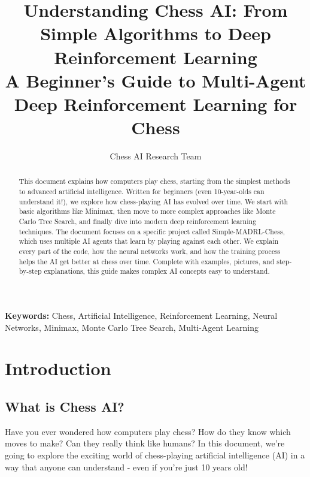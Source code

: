 \documentclass[11pt]{article}
\begin{document}
\title{Understanding Chess AI: From Simple Algorithms to Deep Reinforcement Learning\\\large A Beginner's Guide to Multi-Agent Deep Reinforcement Learning for Chess}
\author{Chess AI Research Team}
\date{}

\maketitle

\begin{abstract}
This document explains how computers play chess, starting from the simplest methods to advanced artificial intelligence. Written for beginners (even 10-year-olds can understand it!), we explore how chess-playing AI has evolved over time. We start with basic algorithms like Minimax, then move to more complex approaches like Monte Carlo Tree Search, and finally dive into modern deep reinforcement learning techniques. The document focuses on a specific project called Simple-MADRL-Chess, which uses multiple AI agents that learn by playing against each other. We explain every part of the code, how the neural networks work, and how the training process helps the AI get better at chess over time. Complete with examples, pictures, and step-by-step explanations, this guide makes complex AI concepts easy to understand.
\end{abstract}

\begin{center}
\textbf{Keywords:} Chess, Artificial Intelligence, Reinforcement Learning, Neural Networks, Minimax, Monte Carlo Tree Search, Multi-Agent Learning
\end{center}

\section{Introduction}
\subsection{What is Chess AI?}

Have you ever wondered how computers play chess? How do they know which moves to make? Can they really think like humans? In this document, we're going to explore the exciting world of chess-playing artificial intelligence (AI) in a way that anyone can understand - even if you're just 10 years old!

\onecolumn
\end{document}
